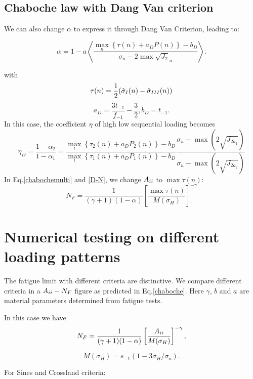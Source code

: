 \subsection{Chaboche law with Dang Van criterion}

We can also change $\alpha$ to express it through Dang Van Criterion, leading to:

\begin{equation}\alpha = 1 - a\left\langle \frac{\max\limits_{n}\left\{\tau{(n)}+a_DP{(n)}\right\}-b_D}{ \sigma_{u} - 2\max\sqrt{J_2}_a}\right\rangle.\end{equation}

with
\begin{equation}
\tau(n)=\frac{1}{2}(\hat{\sigma}_{\Rmnum{1}}(n)-\hat{\sigma}_{\Rmnum{3}}(n))
\end{equation}
$$a_D=\frac{3t_{-1}}{f_{-1}}-\frac{3}{2}, b_D=t_{-1}.$$
In this case, the coefficient $\eta$ of high low sequential loading becomes
\begin{equation}\eta_D=\frac{1-\alpha_2}{1-\alpha_1}=
\frac{\max\limits_{t}\left\{\tau_2{(n)}+a_DP_2{(n)}\right\}-b_D}{\max\limits_{t}\left\{\tau_1{(n)}+a_DP_1{(n)}\right\}-b_D}\frac{ \sigma_{u} - \max(2\sqrt{J_{2a_1}})}{  \sigma_{u} - \max(2\sqrt{J_{2a_2}})}
\end{equation}
In Eq.\eqref{chabochemulti} and \eqref{D-N}, we change $A_{\uppercase\expandafter{\romannumeral2}}$ to $\max\tau(n)$:
\begin{equation}N_F = \frac{1}{(\gamma+1)(1-\alpha)}\left[\frac{\max\tau(n)}{M(\sigma_H)}\right]^{-\gamma}
\label{dvchaboche}
\end{equation} 

\section{Numerical testing on different loading patterns}
The fatigue limit with different criteria are distinctive. We compare different criteria in a $A_{\uppercase\expandafter{\romannumeral2}}-N_F$ figure as predicted in Eq.\eqref{chaboche}. Here
$\gamma$, $b$ and $a$ are material parameters determined from fatigue tests.

In this case we have 
$$N_F = \frac{1}{(\gamma+1)(1-\alpha)}\left[\frac{A_{\uppercase\expandafter{\romannumeral2}}}{M(\sigma_H)}\right]^{-\gamma},$$

$$M(\sigma_H)=s_{-1}\left(1-3\sigma_H/\sigma_u\right).$$

For Sines and Crossland criteria:

